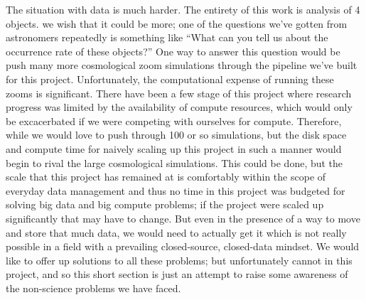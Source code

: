 The situation with data is much harder.
The entirety of this work is analysis of 4 objects.
we wish that it could be more; one of the questions we've gotten from astronomers repeatedly is something like ``What can you tell us about the occurrence rate of these objects?''
One way to answer this question would be push many more cosmological zoom simulations through the pipeline we've built for this project.
Unfortunately, the computational expense of running these zooms is significant.
There have been a few stage of this project where research progress was limited by the availability of compute resources, which would only be excacerbated if we were competing with ourselves for compute.
Therefore, while we would love to push through 100 or so simulations, but the disk space and compute time for naively scaling up this project in such a manner would begin to rival the large cosmological simulations.
This could be done, but the scale that this project has remained at is comfortably within the scope of everyday data management and thus no time in this project was budgeted for solving big data and big compute problems; if the project were scaled up significantly that may have to change.
But even in the presence of a way to move and store that much data, we would need to actually get it which is not really possible in a field with a prevailing closed-source, closed-data mindset.
We would like to offer up solutions to all these problems; but unfortunately cannot in this project, and so this short section is just an attempt to raise some awareness of the non-science problems we have faced.
